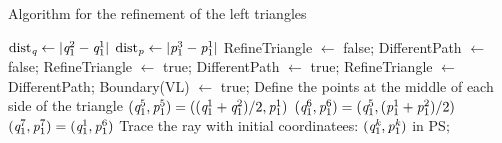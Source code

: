 \begin{algorithm}
\caption{Algorithm for the refinement of the left triangles}\label{alg:left_triangle}
\begin{algorithmic}[1]
\State $\textrm{dist}_{\textit{q}}\gets \mbox{$|\textit{q}_1^2-\textit{q}_1^1|$}$
\State $\textrm{dist}_{\textit{p}}\gets \mbox{$|\textit{p}_1^{3}-\textit{p}_1^1|$}$
\State RefineTriangle $\gets$  false;
\State DifferentPath $\gets$  false;
\State RefineTriangle $\gets$  true;
\EndIf
{}
\State DifferentPath $\gets$  true;
\EndIf
\EndFor
{}
\State RefineTriangle $\gets$  DifferentPath;
\Else
{}
\State Boundary(\textrm{VL}) $\gets$ true; 
\EndIf
\EndIf
{}
\State Define the points at the middle of each side of the triangle
\State $(\textit{q}_1^5, \textit{p}_1^5) = ((\textit{q}_1^1+\textit{q}_1^2)/2, \textit{p}_1^1)$
\State $(\textit{q}_1^6, \textit{p}_1^6) = (\textit{q}_1^5, (\textit{p}_1^1+\textit{p}_1^2)/2)$
\State $(\textit{q}_1^7, \textit{p}_1^7) = (\textit{q}_1^1, \textit{p}_1^6)$
\State Trace the ray with initial coordinatees: $(\textit{q}_1^{\textit{k}}, \textit{p}_1^{\textit{k}})$ in PS;
\EndIf
\EndFor
\State{}
\State{}
\State{}
\State{}
\EndIf
\EndProcedure
\end{algorithmic}
\end{algorithm}


